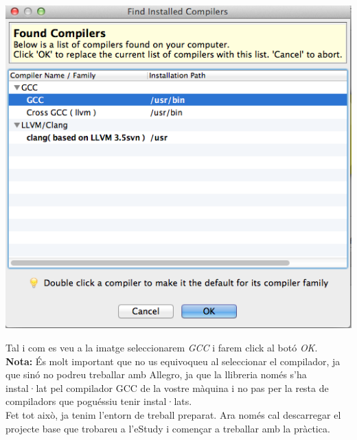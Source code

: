 \documentclass[11pt]{article}
\begin{document}
\begin{center}
	\includegraphics[scale=0.5]{img/Compiler_Selection.png}
\end{center}

\noindent Tal i com es veu a la imatge seleccionarem \textit{GCC} i farem click al botó \textit{OK}.\\


\noindent \textbf{Nota:} És molt important que no us equivoqueu al seleccionar el compilador, ja que sinó no podreu treballar amb Allegro, ja que la llibreria només s'ha instal·lat pel compilador GCC de la vostre màquina i no pas per la resta de compiladors que poguéssiu tenir instal·lats.\\

\noindent Fet tot això, ja tenim l'entorn de treball preparat. Ara només cal descarregar el projecte base que trobareu a l'eStudy i començar a treballar amb la pràctica.
\end{document}
